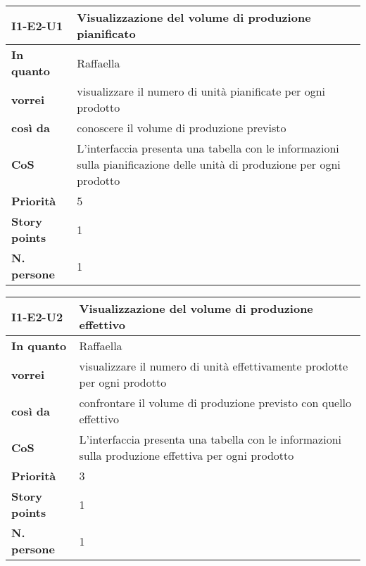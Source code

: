 \begin{table}[H]
  \begin{tabularx}{\textwidth}{lX}
    \toprule
    \textbf{I1-E2-U1} & \textbf{Visualizzazione del volume di produzione pianificato} \\
    \midrule
    \textbf{In quanto} & Raffaella \\
    \textbf{vorrei} & visualizzare il numero di unità pianificate per ogni prodotto \\
    \textbf{così da} & conoscere il volume di produzione previsto \\
    \midrule
    \textbf{CoS} & L'interfaccia presenta una tabella con le informazioni sulla pianificazione delle unità di produzione per ogni prodotto \\
    \midrule
    \textbf{Priorità} & 5 \\
    \textbf{Story points} & 1 \\
    \textbf{N. persone} & 1 \\
    \bottomrule
  \end{tabularx}
  \label{user-story:i1-e2-u1}
\end{table}

\begin{table}[H]
  \begin{tabularx}{\textwidth}{lX}
    \toprule
    \textbf{I1-E2-U2} & \textbf{Visualizzazione del volume di produzione effettivo} \\
    \midrule
    \textbf{In quanto} & Raffaella \\
    \textbf{vorrei} & visualizzare il numero di unità effettivamente prodotte per ogni prodotto \\
    \textbf{così da} & confrontare il volume di produzione previsto con quello effettivo \\
    \midrule
    \textbf{CoS} & L'interfaccia presenta una tabella con le informazioni sulla produzione effettiva per ogni prodotto \\
    \midrule
    \textbf{Priorità} & 3 \\
    \textbf{Story points} & 1 \\
    \textbf{N. persone} & 1 \\
    \bottomrule
  \end{tabularx}
  \label{user-story:i1-e2-u2}
\end{table}

